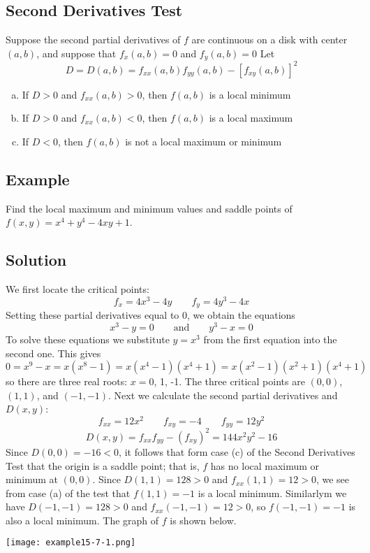 \subsection*{Second Derivatives Test}
Suppose the second partial derivatives of $f$ are continuous on a disk with center
$(a, b)$, and suppose that $f_x (a, b) = 0$ and $f_y (a, b) = 0$ Let
$$D=D(a,b)=f_{xx}(a,b)f_{yy}(a,b)-[f_{xy}(a,b)]^2$$
\begin{enumerate}[(a)]
    \item If $D > 0$ and $f_{xx}(a, b) > 0$, then $f(a, b)$ is a local minimum
    \item If $D > 0$ and $f_{xx}(a, b) < 0$, then $f(a, b)$ is a local maximum
    \item If $D < 0$, then $f(a, b)$ is not a local maximum or minimum
\end{enumerate}

\subsection*{Example}
Find the local maximum and minimum values and saddle points of $f(x,y)=x^4+y^4-4xy+1$.

\subsection*{Solution}
We first locate the critical points:
$$f_x=4x^3-4y \qquad f_y=4y^3-4x$$
Setting these partial derivatives equal to 0, we obtain the equations
$$x^3-y=0 \qquad \text{and} \qquad y^3-x=0$$
To solve these equations we substitute $y=x^3$ from the first equation into the
second one. This gives
$$0=x^9-x=x(x^8-1)=x(x^4-1)(x^4+1)=x(x^2-1)(x^2+1)(x^4+1)$$
so there are three real roots: $x=0$, 1, -1. The three critical points are $(0,0)$,
$(1,1)$, and $(-1,-1)$. Next we calculate the second partial derivatives and $D(x,y)$:
$$f_{xx}=12x^2 \qquad f_{xy}=-4 \qquad f_{yy}=12y^2$$
$$D(x,y)=f_{xx}f_{yy}-(f_{xy})^2=144x^2y^2-16$$
Since $D(0,0)=-16<0$, it follows that form case (c) of the Second Derivatives Test that
the origin is a saddle point; that is, $f$ has no local maximum or minimum at $(0,0)$.
Since $D(1,1)=128>0$ and $f_{xx}(1,1)=12>0$, we see from case (a) of the test that
$f(1,1)=-1$ is a local minimum. Similarlym we have $D(-1,-1)=128>0$ and
$f_{xx}(-1,-1)=12>0$, so $f(-1,-1)=-1$ is also a local minimum. The graph of $f$ is shown below.
\begin{center}
    \texttt{[image: example15-7-1.png]}
\end{center}

